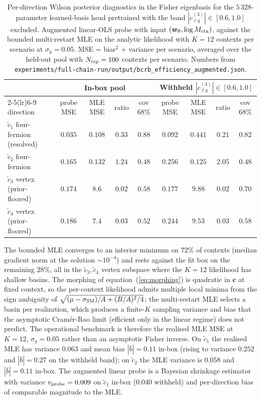 \documentclass[11pt,a4paper]{article}
\begin{document}
\begin{table}[t]
\centering\small
\caption{\label{tab:coverage} Per-direction Wilson posterior diagnostics in the Fisher eigenbasis for the $5\,328$-parameter learned-basis head pretrained with the band $|c_{\ell q}^{(3)}| \in [0.6, 1.0]$ excluded. Augmented linear-OLS probe with input $(\bm{w}_\theta, \log M_{\rm ctx})$, against the bounded multi-restart MLE on the analytic likelihood with $K = 12$ contexts per scenario at $\sigma_y = 0.05$. MSE = bias$^2$ + variance per scenario, averaged over the held-out pool with $N_{\rm rep} = 100$ contexts per scenario. Numbers from \texttt{experiments/full-chain-run/output/bcrb\_efficiency\_augmented.json}.}
\begin{tabular}{lcccccccc}
\toprule
& \multicolumn{4}{c}{In-box pool} & \multicolumn{4}{c}{Withheld $|c_{\ell q}^{(3)}|\in[0.6,1.0]$} \\
\cmidrule(lr){2-5}\cmidrule(lr){6-9}
direction & probe MSE & MLE MSE & ratio & cov $68\%$ & probe MSE & MLE MSE & ratio & cov $68\%$ \\
\midrule
$\tilde{c}_1$ four-fermion (resolved) & $0.035$ & $0.108$ & $0.33$ & $0.88$ & $0.092$ & $0.441$ & $0.21$ & $0.82$ \\
$\tilde{c}_2$ four-fermion             & $0.165$ & $0.132$ & $1.24$ & $0.48$ & $0.256$ & $0.125$ & $2.05$ & $0.48$ \\
$\tilde{c}_3$ vertex (prior-floored)   & $0.174$ & $8.6$   & $0.02$ & $0.58$ & $0.177$ & $9.88$  & $0.02$ & $0.70$ \\
$\tilde{c}_4$ vertex (prior-floored)   & $0.186$ & $7.4$   & $0.03$ & $0.52$ & $0.244$ & $9.53$  & $0.03$ & $0.58$ \\
\bottomrule
\end{tabular}
\end{table}

The bounded MLE converges to an interior minimum on $72\%$ of contexts (median gradient norm at the solution $\sim 10^{-4}$) and rests against the fit box on the remaining $28\%$, all in the $\tilde{c}_3, \tilde{c}_4$ vertex subspace where the $K = 12$ likelihood has shallow basins. The morphing of equation~(\ref{eq:morphing}) is quadratic in $\bm{c}$ at fixed context, so the per-context likelihood admits multiple local minima from the sign ambiguity of $\sqrt{(\mu - \sigma_{\rm SM})/A + (B/A)^2/4}$; the multi-restart MLE selects a basin per realization, which produces a finite-$K$ sampling variance and bias that the asymptotic Cram\'er-Rao limit (efficient only in the linear regime) does not predict. The operational benchmark is therefore the realised MLE MSE at $K = 12$, $\sigma_y = 0.05$ rather than an asymptotic Fisher inverse. On $\tilde{c}_1$ the realised MLE has variance $0.063$ and mean bias $|\bar{b}| = 0.11$ in-box (rising to variance $0.252$ and $|\bar{b}| = 0.27$ on the withheld band); on $\tilde{c}_2$ the MLE variance is $0.058$ and $|\bar{b}| = 0.11$ in-box. The augmented linear probe is a Bayesian shrinkage estimator with variance $v_{\rm probe} = 0.009$ on $\tilde{c}_1$ in-box ($0.040$ withheld) and per-direction bias of comparable magnitude to the MLE.
\end{document}
